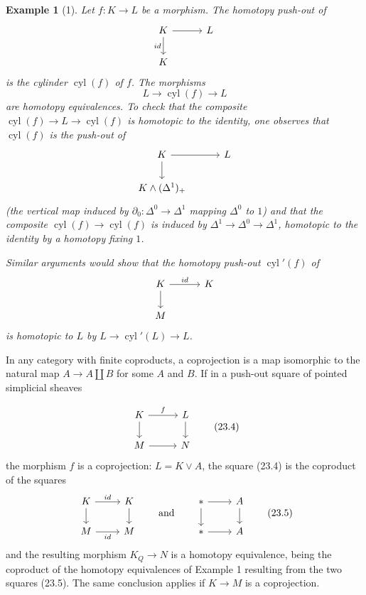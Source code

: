 \documentclass[11pt]{article}
\newcommand{\pt}{*}
\theoremstyle{deligne}
\newtheorem*{example*}{Example}
\newcommand{\heading}[1]{\vspace{0.7em}\noindent{\bfseries #1}\quad}
\begin{document}
\begin{example*}[1]
Let \(f:K\to L\) be a morphism. The homotopy push-out of
\[
\begin{tikzcd}[column sep=3.0em,row sep=1.8em]
K \arrow[r] \arrow[d,"{id}"'] & L \\
K
\end{tikzcd}
\]
is the cylinder \(\operatorname{cyl}(f)\) of \(f\). The morphisms
\[
L\longrightarrow\operatorname{cyl}(f)\longrightarrow L
\]
are homotopy equivalences. To check that the composite \(\operatorname{cyl}(f)\to L\to\operatorname{cyl}(f)\) is homotopic to the identity, one observes that \(\operatorname{cyl}(f)\) is the push-out of
\[
\begin{tikzcd}[column sep=3.0em,row sep=1.8em]
K \arrow[r] \arrow[d] & L \\
K\wedge(\Delta^1)_+
\end{tikzcd}
\]
(the vertical map induced by \(\partial_0:\Delta^0\to\Delta^1\) mapping \(\Delta^0\) to \(1\)) and that the composite \(\operatorname{cyl}(f)\to\operatorname{cyl}(f)\) is induced by \(\Delta^1\to\Delta^0\to\Delta^1\), homotopic to the identity by a homotopy fixing \(1\).

Similar arguments would show that the homotopy push-out \(\operatorname{cyl}'(f)\) of
\[
\begin{tikzcd}[column sep=3.0em,row sep=1.8em]
K \arrow[r,"{id}"] \arrow[d] & K \\
M
\end{tikzcd}
\]
is homotopic to \(L\) by \(L\to\operatorname{cyl}'(L)\to L\).
\end{example*}

\heading{Example 2.} In any category with finite coproducts, a coprojection is a map isomorphic to the natural map \(A\to A\coprod B\) for some \(A\) and \(B\). If in a push-out square of pointed simplicial sheaves

\[
\begin{tikzcd}[column sep=2.8em,row sep=1.7em]
K \arrow[r,"f"] \arrow[d] & L \arrow[d] \\
M \arrow[r] & N
\end{tikzcd}
\tag{23.4}
\]
the morphism \(f\) is a coprojection: \(L=K\vee A\), the square (23.4) is the coproduct of the squares
\[
\begin{tikzcd}[column sep=2.4em,row sep=1.6em]
K \arrow[r,"id"] \arrow[d] & K \arrow[d] \\
M \arrow[r,"id"'] & M
\end{tikzcd}
\qquad\text{and}\qquad
\begin{tikzcd}[column sep=2.4em,row sep=1.6em]
\pt \arrow[r] \arrow[d] & A \arrow[d] \\
\pt \arrow[r] & A
\end{tikzcd}
\tag{23.5}
\]
and the resulting morphism \(K_Q\to N\) is a homotopy equivalence, being the coproduct of the homotopy equivalences of Example 1 resulting from the two squares (23.5). The same conclusion applies if \(K\to M\) is a coprojection.
\end{document}
